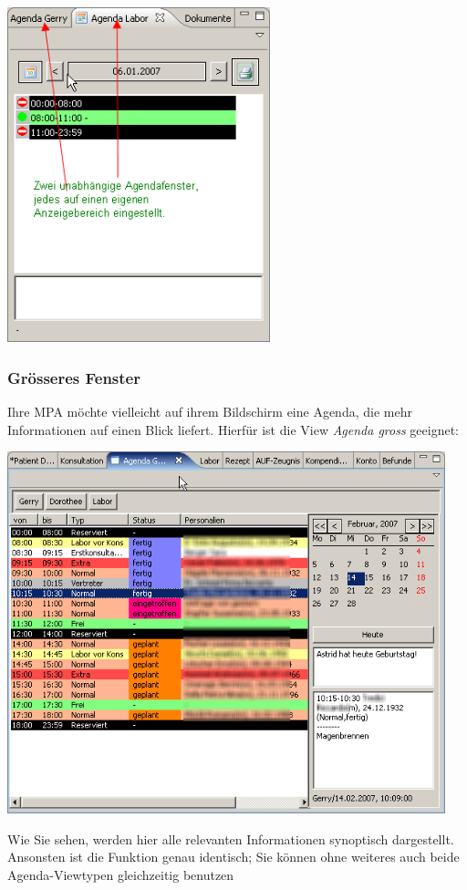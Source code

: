 \includegraphics[width=3in]{images/agendamulti.png}

\subsubsection{Grösseres Fenster}

Ihre MPA möchte vielleicht auf ihrem Bildschirm eine Agenda, die mehr Informationen auf einen Blick liefert. Hierfür ist die View \textit{Agenda gross} geeignet:

\includegraphics[width=5in]{images/agenda2.png}

Wie Sie sehen, werden hier alle relevanten Informationen synoptisch dargestellt. Ansonsten ist die Funktion genau identisch;
Sie können ohne weiteres auch beide Agenda-Viewtypen gleichzeitig benutzen
